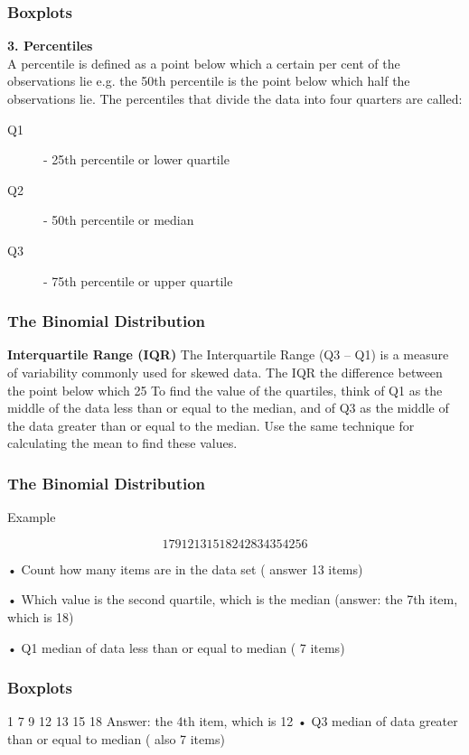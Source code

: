 \begin{frame}
\frametitle{Boxplots}
 
\noindent \textbf{3.   Percentiles}\\

A percentile is defined as a point below which a certain per cent of the observations lie e.g. the 50th percentile is the point below which half the observations lie. The percentiles that divide the data into four quarters are called: 
\begin{description}
\item[Q1]       - 25th percentile or lower quartile
\item[Q2]       - 50th percentile or median
\item[Q3]        - 75th percentile or upper quartile
\end{description}


\frametitle{The Binomial Distribution}
\Large
\noindent \textbf{Interquartile Range (IQR)}
The Interquartile Range (Q3 – Q1) is a  measure of variability commonly used for skewed data.
The IQR  the difference between the point below which 25%
To find the value of the quartiles, think of Q1 as the middle of the data less than or equal to the median, and of Q3 as the middle of the data greater than or equal to the median.
Use the same technique for calculating the mean to find these values.

\frametitle{The Binomial Distribution}
\Large
Example

\begin{itemize}
\item Find the three quartiles and the IQR of the following data

\[ 15  34  7  12  18  9  1  42  56  28  13  24  35  \]

\item First sort the data set into ascending order

\[1 7  9 12 13 15 18  24 28 34 35 42 56]\
\end{itemize}


\[1 7  9 12 13 15 18  24 28 34 35 42 56\]

•	Count how many items are in the data set ( answer 13 items)

•	Which value is the second quartile, which is the median (answer: the 7th item, which is 18)

•	Q1  median of data less than or equal to median ( 7 items)


\frametitle{Boxplots}

1	7  9 12 13 15 18 
 Answer: the 4th item, which is 12
•	Q3  median of data greater than or equal to median ( also 7 items)
\end{frame}
